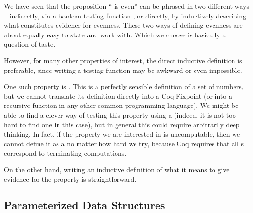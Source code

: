 \documentclass[12pt]{report}
\begin{document}
 We have seen that the proposition `` is even'' can be
    phrased in two different ways -- indirectly, via a boolean testing
    function , or directly, by inductively describing what
    constitutes evidence for evenness.  These two ways of defining
    evenness are about equally easy to state and work with.  Which we
    choose is basically a question of taste.


    However, for many other properties of interest, the direct
    inductive definition is preferable, since writing a testing
    function may be awkward or even impossible.  


    One such property is .  This is a perfectly sensible
    definition of a set of numbers, but we cannot translate its
    definition directly into a Coq Fixpoint (or into a recursive
    function in any other common programming language).  We might be
    able to find a clever way of testing this property using a
     (indeed, it is not too hard to find one in this case),
    but in general this could require arbitrarily deep thinking.  In
    fact, if the property we are interested in is uncomputable, then
    we cannot define it as a  no matter how hard we try,
    because Coq requires that all s correspond to
    terminating computations.


    On the other hand, writing an inductive definition of what it
    means to give evidence for the property  is
    straightforward. \begin{coqdoccode}
\coqdocemptyline
\end{coqdoccode}
\subsection{Parameterized Data Structures}
\end{document}
